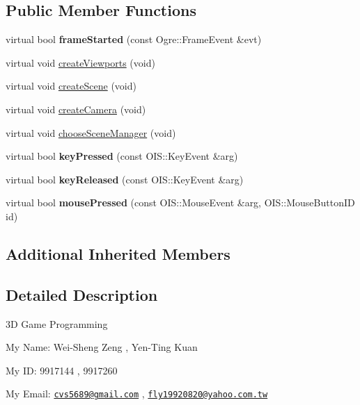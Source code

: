 \subsection*{Public Member Functions}
\begin{DoxyCompactItemize}
\item 
\hypertarget{class_basic_tutorial__00_a94e281a96584a25bf57b1c5e73737c81}{virtual bool {\bfseries frame\-Started} (const Ogre\-::\-Frame\-Event \&evt)}\label{class_basic_tutorial__00_a94e281a96584a25bf57b1c5e73737c81}

\item 
virtual void \hyperlink{class_basic_tutorial__00_adc2454d9f8226e0958ecf702f355846e}{create\-Viewports} (void)
\item 
virtual void \hyperlink{class_basic_tutorial__00_a15a3d4673724ec99077ce992f996a550}{create\-Scene} (void)
\item 
virtual void \hyperlink{class_basic_tutorial__00_a1bf709417d654dffc2ea10987412b912}{create\-Camera} (void)
\item 
virtual void \hyperlink{class_basic_tutorial__00_aba97a29d983586d2dc8e108d3bccf721}{choose\-Scene\-Manager} (void)
\item 
\hypertarget{class_basic_tutorial__00_adc1a0b32d78b1980b3ee51a1b1e1e69b}{virtual bool {\bfseries key\-Pressed} (const O\-I\-S\-::\-Key\-Event \&arg)}\label{class_basic_tutorial__00_adc1a0b32d78b1980b3ee51a1b1e1e69b}

\item 
\hypertarget{class_basic_tutorial__00_aacca7a0a2a5a0e0d007b9c6c30b4941b}{virtual bool {\bfseries key\-Released} (const O\-I\-S\-::\-Key\-Event \&arg)}\label{class_basic_tutorial__00_aacca7a0a2a5a0e0d007b9c6c30b4941b}

\item 
\hypertarget{class_basic_tutorial__00_af0e5dec72c58e157c2a63ffa5fd8c7c7}{virtual bool {\bfseries mouse\-Pressed} (const O\-I\-S\-::\-Mouse\-Event \&arg, O\-I\-S\-::\-Mouse\-Button\-I\-D id)}\label{class_basic_tutorial__00_af0e5dec72c58e157c2a63ffa5fd8c7c7}

\end{DoxyCompactItemize}
\subsection*{Additional Inherited Members}


\subsection{Detailed Description}
3\-D Game Programming \par
 My Name\-: Wei-\/\-Sheng Zeng , Yen-\/\-Ting Kuan \par
 My I\-D\-: 9917144 , 9917260 \par
 My Email\-: \href{mailto:cvs5689@gmail.com}{\tt cvs5689@gmail.\-com} , \href{mailto:fly19920820@yahoo.com.tw}{\tt fly19920820@yahoo.\-com.\-tw} 

